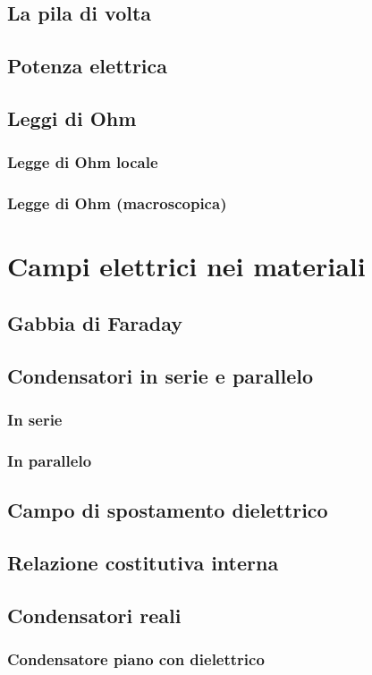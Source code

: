 \documentclass{book}
\begin{document}
\section{La pila di volta}
\section{Potenza elettrica}
\section{Leggi di Ohm}
\subsection{Legge di Ohm locale}
\subsection{Legge di Ohm (macroscopica)}

\chapter{Campi elettrici nei materiali}
\section{Gabbia di Faraday}
\section{Condensatori in serie e parallelo}
\subsection{In serie}
\subsection{In parallelo}
\section{Campo di spostamento dielettrico}
\section{Relazione costitutiva interna}
\section{Condensatori reali}

\subsection{Condensatore piano con dielettrico}
\end{document}
